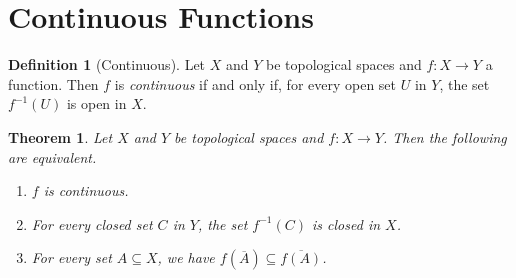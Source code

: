 \documentclass{report}
\newtheorem{thm}[lm]{Theorem}
\theoremstyle{definition}
\newtheorem{df}[lm]{Definition}
\begin{document}
  \section{Continuous Functions}

  \begin{df}[Continuous]
    Let $X$ and $Y$ be topological spaces and $f : X \rightarrow Y$ a function.
    Then $f$ is \emph{continuous} if and only if, for every open set $U$ in
    $Y$,
    the set $f^{-1}(U)$ is open in $X$.
  \end{df}

  \begin{thm}
    \label{thm:topology:continuous:characterisation}
    Let $X$ and $Y$ be topological spaces and $f : X \rightarrow Y$. Then the
    following are equivalent.
    \begin{enumerate}
      \item $f$ is continuous.
      \item For every closed set $C$ in $Y$, the set $f^{-1}(C)$ is closed in
      $X$.
      \item For every set $A \subseteq X$, we have $f(\overline{A}) \subseteq
      \overline{f(A)}$.
    \end{enumerate}
  \end{thm}
\end{document}

